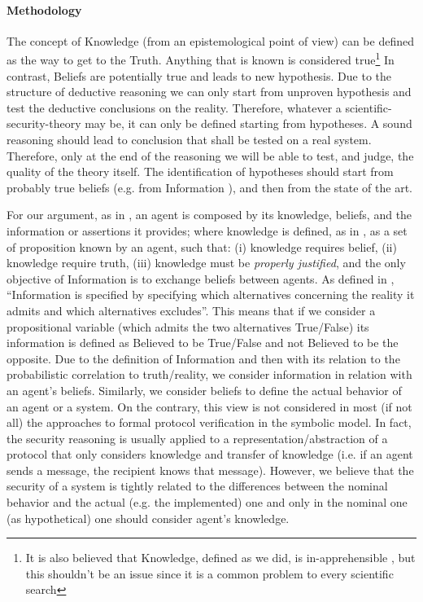 \paragraph{Methodology}
The concept of Knowledge \autocite{Hintikka1962knowledge} (from an
epistemological point of view) can be defined as the way to get to the Truth.
Anything that is known is considered true\footnote{It is also
believed that Knowledge, defined as we did, is in-apprehensible \autocite{Empiricus1990Pyrrhonism}, but this shouldn't be an issue since it is a common problem to every scientific search}
In contrast, Beliefs \autocite{Hintikka1962knowledge} are potentially true and
leads to new hypothesis. Due to the
structure of deductive reasoning we can only start from unproven hypothesis and test the
deductive conclusions on the reality. Therefore, whatever a scientific-security-theory may be,
it can only be defined starting from hypotheses.  A sound reasoning should lead to
conclusion that shall be tested on a real system. Therefore, only at the end of
the reasoning we will be able to test, and judge, the quality of the theory
itself. The identification of hypotheses should start from probably true
beliefs (e.g. from Information \autocite{Hintikka1993Information}), and then from the state of the art.

For our argument, 
as in \autocite{Santaca2016abf}, an agent is composed by its knowledge, beliefs, and the information or assertions
it provides; where knowledge is defined, as in \autocite{Steup2020epistemology}, as
a set of proposition known by an agent, such that: (i) knowledge requires belief,
(ii) knowledge require truth, (iii) knowledge must be \emph{properly justified}, and
the only objective of Information is to exchange beliefs between agents.
As defined in \autocite{Hintikka1993Information}, ``Information is specified by specifying
which alternatives concerning the reality it admits and which alternatives
excludes''. This means that if we consider a propositional
variable (which admits the two alternatives True/False) its information is
defined as Believed to be True/False and not Believed to be the opposite. 
Due to the definition of Information and then with its relation to the probabilistic
correlation to truth/reality, we consider
information in relation with an agent's beliefs. Similarly, we consider
beliefs to define the actual behavior of an agent or a system. On the 
contrary, this view is not considered in most (if not all) the approaches to formal protocol verification
in the symbolic model. In fact, the security reasoning is usually applied to a representation/abstraction
of a protocol that only considers knowledge and transfer of knowledge (i.e.
if an agent sends a message, the recipient knows that message). However,
we believe that the security of a system is tightly related to the differences between
the nominal behavior and the actual (e.g. the implemented) one and only in the
nominal one (as hypothetical) one should consider agent's knowledge.

